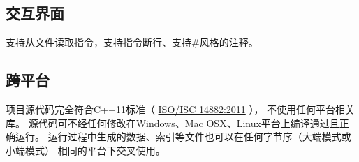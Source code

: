    \subsection{交互界面}
        支持从文件读取指令，支持指令断行、支持\#风格的注释。
    \subsection{跨平台}
        项目源代码完全符合C++11标准（%
        \href{https://isocpp.org/std/the-standard}{ISO/ISC 14882:2011}%
        ），%
        不使用任何平台相关库。%
        源代码可不经任何修改在Windows、Mac OSX、Linux平台上编译通过且正确运行。%
        运行过程中生成的数据、索引等文件也可以在任何字节序（大端模式或小端模式）%
        相同的平台下交叉使用。


